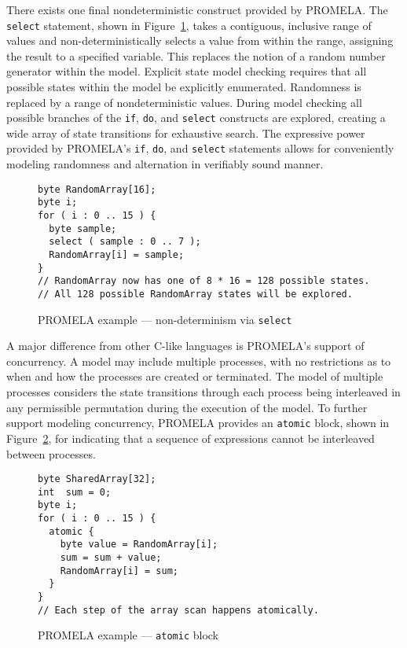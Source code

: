 There exists one final nondeterministic construct provided by PROMELA.\@
The \texttt{select} statement, shown in Figure\ \ref{fig:selection}, takes a contiguous, inclusive range of values and non-deterministically selects a value from within the range, assigning the result to a specified variable.
This replaces the notion of a random number generator within the model.
Explicit state model checking requires that all possible states within the model be explicitly enumerated.
Randomness is replaced by a range of nondeterministic values.
During model checking all possible branches of the \texttt{if}, \texttt{do}, and \texttt{select} constructs are explored, creating a wide array of state transitions for exhaustive search.
The expressive power provided by PROMELA's \texttt{if}, \texttt{do}, and \texttt{select} statements allows for conveniently modeling randomness and alternation in verifiably sound manner.

\begin{figure}
\centering
\caption{\label{fig:selection}PROMELA example --- non-determinism via \texttt{select}}
\begin{verbatim}
byte RandomArray[16];
byte i;
for ( i : 0 .. 15 ) {
  byte sample;
  select ( sample : 0 .. 7 );
  RandomArray[i] = sample;
}
// RandomArray now has one of 8 * 16 = 128 possible states.
// All 128 possible RandomArray states will be explored.
\end{verbatim}
\end{figure}

A major difference from other C-like languages is PROMELA's support of concurrency.
A model may include multiple processes, with no restrictions as to when and how the processes are created or terminated.
The model of multiple processes considers the state transitions through each process being interleaved in any permissible permutation during the execution of the model.
To further support modeling concurrency, PROMELA provides an \texttt{atomic} block, shown in Figure\ \ref{fig:atomic}, for indicating that a sequence of expressions cannot be interleaved between processes.

\begin{figure}
\centering
\caption{\label{fig:atomic}PROMELA example --- \texttt{atomic} block}
\begin{verbatim}
byte SharedArray[32];
int  sum = 0; 
byte i;
for ( i : 0 .. 15 ) {
  atomic {
    byte value = RandomArray[i];
    sum = sum + value;
    RandomArray[i] = sum;
  }
}
// Each step of the array scan happens atomically.
\end{verbatim}
\end{figure}



